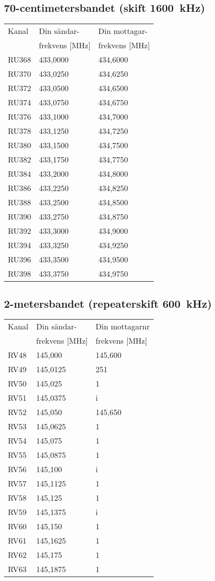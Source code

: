 \subsection{70-centimetersbandet (skift 1600~kHz)}
\begin{tabular}{ l | l | l }
  Kanal & Din sändar- & Din mottagar- \\
        & frekvens [MHz] & frekvens [MHz] \\
  \hline
  RU368 & 433,0000 & 434,6000 \\
  RU370 & 433,0250 & 434,6250 \\
  RU372 & 433,0500 & 434,6500 \\
  RU374 & 433,0750 & 434,6750 \\
  RU376 & 433,1000 & 434,7000 \\
  RU378 & 433,1250 & 434,7250 \\
  RU380 & 433,1500 & 434,7500 \\
  RU382 & 433,1750 & 434,7750 \\
  RU384 & 433,2000 & 434,8000 \\
  RU386 & 433,2250 & 434,8250 \\
  RU388 & 433,2500 & 434,8500 \\
  RU390 & 433,2750 & 434,8750 \\
  RU392 & 433,3000 & 434,9000 \\
  RU394 & 433,3250 & 434,9250 \\
  RU396 & 433,3500 & 434,9500 \\
  RU398 & 433,3750 & 434,9750 \\
\end{tabular}

\subsection{2-metersbandet (repeaterskift 600~kHz)}
\begin{tabular}{ l | l | l }
  Kanal & Din sändar- & Din mottagarnr \\
        & frekvens [MHz] & frekvens [MHz] \\
  \hline
  RV48 & 145,000 & 145,600 \\
  RV49 & 145,0125 & 251 \\
  RV50 & 145,025 & 1 \\
  RV51 & 145,0375 & i \\
  RV52 & 145,050 & 145,650 \\
  RV53 & 145,0625 & 1 \\
  RV54 & 145,075 & 1 \\
  RV55 & 145,0875 & 1 \\
  RV56 & 145,100 & i \\
  RV57 & 145,1125 & 1 \\
  RV58 & 145,125 & 1 \\
  RV59 & 145,1375 & i \\
  RV60 & 145,150 & 1 \\
  RV61 & 145,1625 & 1 \\
  RV62 & 145,175 & 1 \\
  RV63 & 145,1875 & 1 \\
\end{tabular}

